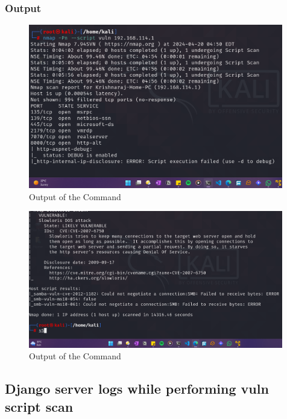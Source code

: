\documentclass[11pt]{article}
\begin{document}
\subsubsection*{Output}
\begin{figure}[H]
    \centering
    \includegraphics[width=0.99\textwidth]{a3_ss (12).png}
    \caption{Output of the Command}
\end{figure}
\begin{figure}[H]
    \centering
    \includegraphics[width=0.99\textwidth]{a3_ss (15).png}
    \caption{Output of the Command}
\end{figure}
\subsection{Django server logs while performing vuln script scan}
\end{document}

